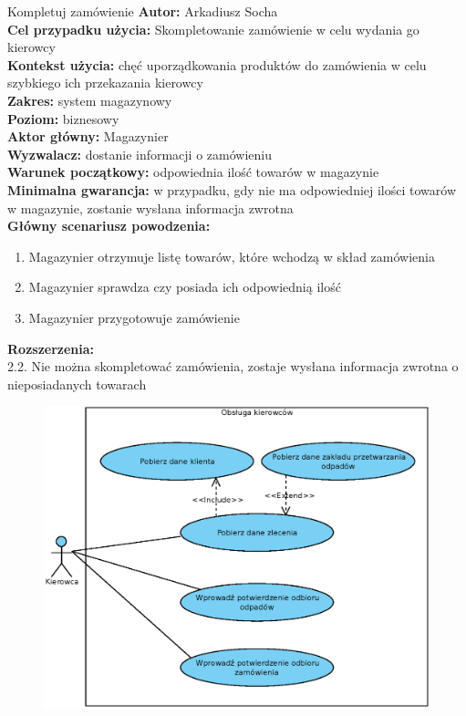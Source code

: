 \begin{usecase}{Kompletuj zamówienie}
	\textbf{Autor:} Arkadiusz Socha\\
	\textbf{Cel przypadku użycia:} Skompletowanie zamówienie w celu wydania go kierowcy \\
	\textbf{Kontekst użycia:} chęć uporządkowania produktów do zamówienia w celu szybkiego ich przekazania kierowcy \\
	\textbf{Zakres:} system magazynowy \\
	\textbf{Poziom:} biznesowy \\
	\textbf{Aktor główny:} Magazynier \\
	\textbf{Wyzwalacz:} dostanie informacji o zamówieniu \\
	\textbf{Warunek początkowy:} odpowiednia ilość towarów w magazynie \\
	\textbf{Minimalna gwarancja:} w przypadku, gdy nie ma odpowiedniej ilości towarów w magazynie, zostanie wysłana informacja zwrotna  \\
	\textbf{Główny scenariusz powodzenia:} 
		\begin{enumerate}
			\item Magazynier otrzymuje listę towarów, które wchodzą w skład zamówienia
			\item Magazynier sprawdza czy posiada ich odpowiednią ilość
			\item Magazynier przygotowuje zamówienie
		\end{enumerate}
	\textbf{Rozszerzenia:} \\
	2.2. Nie można skompletować zamówienia, zostaje wysłana informacja zwrotna o nieposiadanych towarach\\
\end{usecase}

\begin{figure}[H]
	\centering
	\includegraphics[width=.8\textwidth]{img/UC/kierowcy.eps}
\end{figure}


